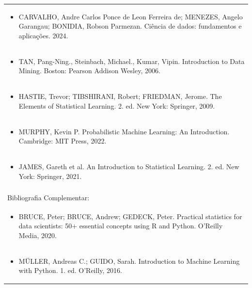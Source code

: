 \documentclass[11pt]{article}
\begin{document}
\begin{center}
\begin{longtable}{|p{4cm}|p{4cm}|p{4cm}|p{4cm}|}
\multicolumn{4}{|p{\dimexpr 16cm + 6\tabcolsep\relax}|}{\begin{itemize}\item CARVALHO, Andre Carlos Ponce de Leon Ferreira de; MENEZES, Angelo Garangau; BONIDIA, Robson Parmezan. Ciência de dados: fundamentos e aplicações. 2024.\end{itemize}}\\
\multicolumn{4}{|p{\dimexpr 16cm + 6\tabcolsep\relax}|}{\begin{itemize}\item TAN, Pang-Ning., Steinbach, Michael., Kumar, Vipin. Introduction to Data Mining. Boston: Pearson Addison Wesley, 2006.\end{itemize}}\\
\multicolumn{4}{|p{\dimexpr 16cm + 6\tabcolsep\relax}|}{\begin{itemize}\item HASTIE, Trevor; TIBSHIRANI, Robert; FRIEDMAN, Jerome. The Elements of Statistical Learning. 2. ed. New York: Springer, 2009.\end{itemize}}\\
\multicolumn{4}{|p{\dimexpr 16cm + 6\tabcolsep\relax}|}{\begin{itemize}\item MURPHY, Kevin P. Probabilistic Machine Learning: An Introduction. Cambridge: MIT Press, 2022.\end{itemize}}\\
\multicolumn{4}{|p{\dimexpr 16cm + 6\tabcolsep\relax}|}{\begin{itemize}\item JAMES, Gareth et al. An Introduction to Statistical Learning. 2. ed. New York: Springer, 2021.\end{itemize}}\\
\multicolumn{4}{|p{16cm}|}{}\\
\hline
\multicolumn{4}{|p{16cm}|}{Bibliografia Complementar:}\\*
\multicolumn{4}{|p{\dimexpr 16cm + 6\tabcolsep\relax}|}{\begin{itemize}\item BRUCE, Peter; BRUCE, Andrew; GEDECK, Peter. Practical statistics for data scientists: 50+ essential concepts using R and Python. O'Reilly Media, 2020.\end{itemize}}\\
\multicolumn{4}{|p{\dimexpr 16cm + 6\tabcolsep\relax}|}{\begin{itemize}\item MÜLLER, Andreas C.; GUIDO, Sarah. Introduction to Machine Learning with Python. 1. ed. O’Reilly, 2016.\end{itemize}}\\

\end{longtable}
\end{center}
\end{document}
